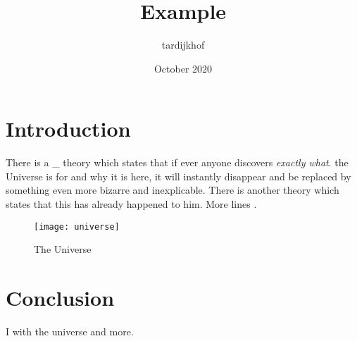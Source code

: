 \documentclass{article}
\title{Example}
\author{tardijkhof}
\date{October 2020}
\begin{document}
\maketitle

\section{Introduction}\label{sec:multi-sided-plm}
There is a \_ theory which states that if ever anyone discovers \textit{exactly what}.  the Universe is for and why it is here, it will instantly disappear and be replaced by something even more bizarre and inexplicable.
There is another theory which states that this has already happened to him. More lines \cite{me}.

\begin{figure}[h!]
\centering
\texttt{[image: universe]}
\caption{The Universe}
\label{fig:universe}
\end{figure}

\section{Conclusion}
I with the universe \cite{tadst} and more.



\end{document}
